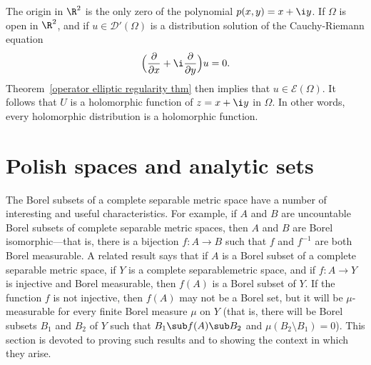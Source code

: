 \begin{example}
The origin in $\R^2$ is the only zero of the polynomial $p(x,y)=x+\i y$. If $\Omega$ is open in $\R^2$, and if $u\in\mathscr{D}'(\Omega)$ is a distribution solution of the Cauchy-Riemann equation
\[\Big(\frac{\partial}{\partial x}+\i\frac{\partial}{\partial y}\Big)u=0.\]
Theorem~\ref{operator elliptic regularity thm} then implies that $u\in \mathscr{E}(\Omega)$. It follows that $U$ is a holomorphic function of $z=x+\i y$ in $\Omega$. In other words, every holomorphic distribution is a holomorphic function.
\end{example}
\chapter{Polish spaces and analytic sets}
The Borel subsets of a complete separable metric space have a number of interesting and useful characteristics. For example, if $A$ and $B$ are uncountable Borel subsets of complete separable metric spaces, then $A$ and $B$ are Borel isomorphic---that is, there is a bijection $f:A\to B$ such that $f$ and $f^{-1}$ are both Borel measurable. A related result says that if $A$ is a Borel subset of a complete separable metric space, if $Y$ is a complete separablemetric space, and if $f:A\to Y$ is injective and Borel measurable, then $f(A)$ is a Borel subset of $Y$. If the function $f$ is not injective, then $f(A)$ may not be a Borel set, but it will be $\mu$-measurable for every finite Borel measure $\mu$ on $Y$ (that is, there will be Borel subsets $B_1$ and $B_2$ of $Y$ such that $B_1\sub f(A)\sub B_2$ and $\mu(B_2\setminus B_1)=0$). This section is devoted to proving such results and to showing the context in which they arise.
